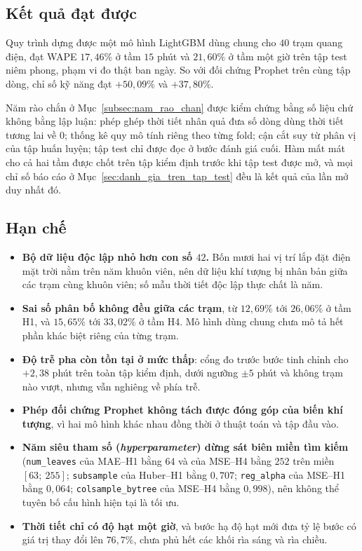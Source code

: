 \documentclass[12pt, a4paper]{report}
\begin{document}
\FloatBarrier
\subsection{Kết quả đạt được}

Quy trình dựng được một mô hình LightGBM dùng chung cho $40$ trạm quang điện, đạt WAPE
$17{,}46\%$ ở tầm $15$ phút và $21{,}60\%$ ở tầm một giờ trên tập test niêm phong, phạm vi đo
thật ban ngày. So với đối chứng Prophet trên cùng tập dòng, chỉ số kỹ năng đạt $+50{,}09\%$
và $+37{,}80\%$.

Năm rào chắn ở Mục~\ref{subsec:nam_rao_chan} được kiểm
chứng bằng số liệu chứ không bằng lập luận: phép ghép thời tiết nhân quả đưa số dòng dùng thời
tiết tương lai về $0$; thống kê quy mô tính riêng theo từng fold; cận cắt suy từ phân vị của
tập huấn luyện; tập test chỉ được đọc ở bước đánh giá cuối. Hàm mất mát cho cả hai tầm được chốt trên tập kiểm
định trước khi tập test được mở, và mọi chỉ số báo cáo ở Mục~\ref{sec:danh_gia_tren_tap_test} đều là kết quả của lần mở
duy nhất đó.

\FloatBarrier
\subsection{Hạn chế}

\begin{itemize}
    \item \textbf{Bộ dữ liệu độc lập nhỏ hơn con số $42$.} Bốn mươi hai vị trí lắp đặt điện mặt trời nằm trên
    năm khuôn viên, nên dữ liệu khí tượng bị nhân bản giữa các trạm cùng khuôn viên; số mẫu
    thời tiết độc lập thực chất là năm.
    \item \textbf{Sai số phân bố không đều giữa các trạm}, từ $12{,}69\%$ tới $26{,}06\%$ ở
    tầm H1, và $15{,}65\%$ tới $33{,}02\%$ ở tầm H4. Mô hình dùng chung chưa mô tả hết phần khác
    biệt riêng của từng trạm.
    \item \textbf{Độ trễ pha còn tồn tại ở mức thấp}: cổng đo trước bước tinh chỉnh cho
    $+2{,}38$ phút trên toàn tập kiểm định, dưới ngưỡng $\pm 5$ phút và không trạm nào vượt,
    nhưng vẫn nghiêng về phía trễ.
    \item \textbf{Phép đối chứng Prophet không tách được đóng góp của biến khí tượng}, vì hai
    mô hình khác nhau đồng thời ở thuật toán và tập đầu vào.
    \item \textbf{Năm siêu tham số (\textit{hyperparameter}) dừng sát biên miền tìm kiếm}
    (\texttt{num\_leaves} của MAE--H1 bằng $64$ và của MSE--H4 bằng $252$ trên miền
    $[63;\ 255]$; \texttt{subsample} của Huber--H1 bằng $0{,}707$; \texttt{reg\_alpha} của
    MSE--H1 bằng $0{,}064$; \texttt{colsample\_bytree} của MSE--H4 bằng $0{,}998$), nên không
    thể tuyên bố cấu hình hiện tại là tối ưu.
    \item \textbf{Thời tiết chỉ có độ hạt một giờ}, và bước hạ độ hạt mới đưa tỷ lệ
    bước có giá trị thay đổi lên $76{,}7\%$, chưa phủ hết các khối rìa sáng và rìa chiều.
\end{itemize}
\end{document}
